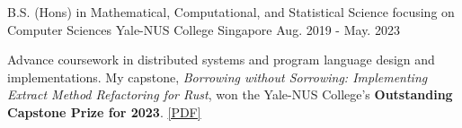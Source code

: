 

\begin{cventries}

  \cventry
    {B.S. (Hons) in Mathematical, Computational, and Statistical Science focusing on Computer Sciences} %
    {Yale-NUS College} %
    {Singapore} %
    {Aug. 2019 - May. 2023} %
    {
      \begin{cvitems} %
        \item {Advance coursework in distributed systems and program language design and implementations.  My capstone, \textit{Borrowing without Sorrowing: Implementing Extract Method Refactoring for Rust}, won the Yale-NUS College's \textbf{Outstanding Capstone Prize for 2023}. \href{https://fastmail-resource.sewenthy.dev/public/academics/bsc_capstone_borrowing_without_sorrowing.pdf}{[PDF]}}
      \end{cvitems}
    }

\end{cventries}
